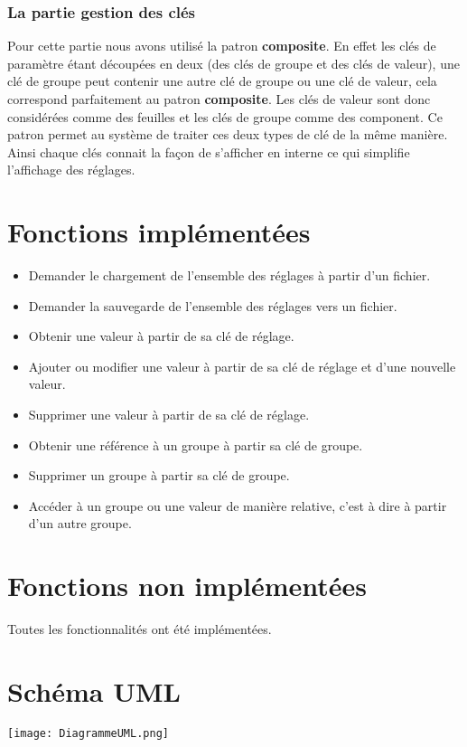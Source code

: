 \documentclass[12pt]{article}
\begin{document}
	\subsubsection{La partie gestion des clés}
	
		Pour cette partie nous avons utilisé la patron \textbf{composite}. En effet les clés de paramètre étant découpées en deux (des clés de groupe et des clés de valeur), une clé de groupe peut contenir une autre clé de groupe ou une clé de valeur, cela correspond parfaitement au patron \textbf{composite}. Les clés de valeur sont donc considérées comme des feuilles et les clés de groupe comme des component. Ce patron permet au système de traiter ces deux types de clé de la même manière. Ainsi chaque clés connait la façon de s'afficher en interne ce qui simplifie l'affichage des réglages.
\section{Fonctions implémentées}
\label{sec:fonctions_impl}

\begin{itemize}
	\item Demander le chargement de l’ensemble des réglages à partir d’un fichier.
	\item Demander la sauvegarde de l’ensemble des réglages vers un fichier.
	\item Obtenir une valeur à partir de sa clé de réglage.
	\item Ajouter ou modifier une valeur à partir de sa clé de réglage et d’une nouvelle valeur.
	\item Supprimer une valeur à partir de sa clé de réglage.
	\item Obtenir une référence à un groupe à partir sa clé de groupe.
	\item Supprimer un groupe à partir sa clé de groupe.
	\item Accéder à un groupe ou une valeur de manière relative, c'est à dire à partir d’un autre groupe.
\end{itemize}

\section{Fonctions non implémentées}
\label{sec:fonctions_non_impl}
Toutes les fonctionnalités ont été implémentées.

\section{Schéma UML}
\texttt{[image: DiagrammeUML.png]}
\end{document}
